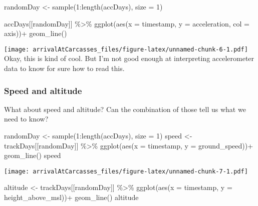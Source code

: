 \documentclass[
]{article}
\newenvironment{Shaded}{\begin{snugshade}}{\end{snugshade}}
\newcommand{\AttributeTok}[1]{\textcolor[rgb]{0.77,0.63,0.00}{#1}}
\newcommand{\DecValTok}[1]{\textcolor[rgb]{0.00,0.00,0.81}{#1}}
\newcommand{\FunctionTok}[1]{\textcolor[rgb]{0.00,0.00,0.00}{#1}}
\newcommand{\NormalTok}[1]{#1}
\newcommand{\OtherTok}[1]{\textcolor[rgb]{0.56,0.35,0.01}{#1}}
\newcommand{\SpecialCharTok}[1]{\textcolor[rgb]{0.00,0.00,0.00}{#1}}
\begin{document}
\begin{Shaded}
\begin{Highlighting}[]
\NormalTok{randomDay }\OtherTok{\textless{}{-}} \FunctionTok{sample}\NormalTok{(}\DecValTok{1}\SpecialCharTok{:}\FunctionTok{length}\NormalTok{(accDays), }\AttributeTok{size =} \DecValTok{1}\NormalTok{)}

\NormalTok{accDays[[randomDay]] }\SpecialCharTok{\%\textgreater{}\%}
  \FunctionTok{ggplot}\NormalTok{(}\FunctionTok{aes}\NormalTok{(}\AttributeTok{x =}\NormalTok{ timestamp, }\AttributeTok{y =}\NormalTok{ acceleration, }\AttributeTok{col =}\NormalTok{ axis))}\SpecialCharTok{+}
  \FunctionTok{geom\_line}\NormalTok{()}
\end{Highlighting}
\end{Shaded}

\texttt{[image: arrivalAtCarcasses\_files/figure-latex/unnamed-chunk-6-1.pdf]}
Okay, this is kind of cool. But I'm not good enough at interpreting
accelerometer data to know for sure how to read this.

\hypertarget{speed-and-altitude}{%
\subsubsection{Speed and altitude}\label{speed-and-altitude}}

What about speed and altitude? Can the combination of those tell us what
we need to know?

\begin{Shaded}
\begin{Highlighting}[]
\NormalTok{randomDay }\OtherTok{\textless{}{-}} \FunctionTok{sample}\NormalTok{(}\DecValTok{1}\SpecialCharTok{:}\FunctionTok{length}\NormalTok{(accDays), }\AttributeTok{size =} \DecValTok{1}\NormalTok{)}
\NormalTok{speed }\OtherTok{\textless{}{-}}\NormalTok{ trackDays[[randomDay]] }\SpecialCharTok{\%\textgreater{}\%}
  \FunctionTok{ggplot}\NormalTok{(}\FunctionTok{aes}\NormalTok{(}\AttributeTok{x =}\NormalTok{ timestamp, }\AttributeTok{y =}\NormalTok{ ground\_speed))}\SpecialCharTok{+}
  \FunctionTok{geom\_line}\NormalTok{()}
\NormalTok{speed}
\end{Highlighting}
\end{Shaded}

\texttt{[image: arrivalAtCarcasses\_files/figure-latex/unnamed-chunk-7-1.pdf]}

\begin{Shaded}
\begin{Highlighting}[]
\NormalTok{altitude }\OtherTok{\textless{}{-}}\NormalTok{ trackDays[[randomDay]] }\SpecialCharTok{\%\textgreater{}\%}
  \FunctionTok{ggplot}\NormalTok{(}\FunctionTok{aes}\NormalTok{(}\AttributeTok{x =}\NormalTok{ timestamp, }\AttributeTok{y =}\NormalTok{ height\_above\_msl))}\SpecialCharTok{+}
  \FunctionTok{geom\_line}\NormalTok{()}
\NormalTok{altitude}
\end{Highlighting}
\end{Shaded}
\end{document}

